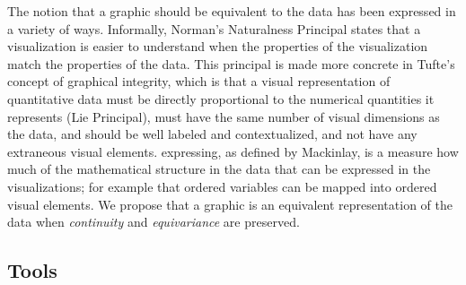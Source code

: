 \documentclass[../main.tex]{subfiles}
\begin{document}
The notion that a graphic should be equivalent to the data has been expressed in a variety of ways. Informally, Norman's Naturalness Principal\cite{NaturalnessPrincipleInfoVis} states that a visualization is easier to understand when the properties of the visualization match the properties of the data. This principal is made more concrete in Tufte's concept of graphical integrity, which is that a visual representation of quantitative data must be directly proportional to the numerical quantities it represents (Lie Principal), must have the same number of visual dimensions as the data, and should be well labeled and contextualized, and not have any extraneous visual elements\cite{tufteVisualDisplayQuantitative2001}. expressing, as defined by Mackinlay, is a measure how much of the mathematical structure in the data that can be expressed in the visualizations; for example that ordered variables can be mapped into ordered visual elements. We propose that a graphic is an equivalent representation of the data when \textit{continuity} and \textit{equivariance} are preserved.



\subsection{Tools}
\label{sec:intro_data_tools}
\end{document}
